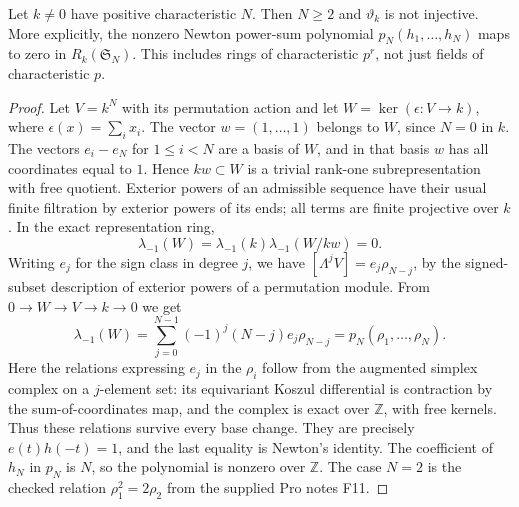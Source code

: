 \begin{proposition}
\label{C:positive_characteristic}
Let $k\ne0$ have positive characteristic $N$. Then $N\geq2$ and
$\vartheta_k$ is not injective. More explicitly, the nonzero Newton power-sum
polynomial $p_N(h_1,\ldots,h_N)$ maps to zero in $R_k(\mathfrak S_N)$.
This includes rings of characteristic $p^r$, not just fields of characteristic
$p$.
\end{proposition}
\begin{proof}
Let $V=k^N$ with its permutation action and let
$W=\ker(\epsilon:V\to k)$, where $\epsilon(x)=\sum_i x_i$. The vector
$w=(1,\ldots,1)$ belongs to $W$, since $N=0$ in $k$.
The vectors $e_i-e_N$ for $1\leq i<N$ are a basis of $W$, and in that basis
$w$ has all coordinates equal to $1$. Hence $kw\subset W$ is a trivial
rank-one subrepresentation with free quotient. Exterior powers of an admissible
sequence have their usual finite filtration by exterior powers of its ends;
all terms are finite projective over $k$. In the exact representation ring,
\[
 \lambda_{-1}(W)=\lambda_{-1}(k)\lambda_{-1}(W/kw)=0.
\]
Writing $e_j$ for the sign class in degree $j$, we have
$[\Lambda^jV]=e_j\rho_{N-j}$, by the signed-subset description of exterior
powers of a permutation module. From $0\to W\to V\to k\to0$ we get
\[
 \lambda_{-1}(W)
 =\sum_{j=0}^{N-1}(-1)^j(N-j)e_j\rho_{N-j}
 =p_N(\rho_1,\ldots,\rho_N).
\]
Here the relations expressing $e_j$ in the $\rho_i$ follow from the augmented
simplex complex on a $j$-element set: its equivariant Koszul differential is
contraction by the sum-of-coordinates map, and the complex is exact over
$\mathbb Z$, with free kernels. Thus these relations survive every base
change. They are precisely $e(t)h(-t)=1$, and the last equality is Newton's
identity. The coefficient of $h_N$ in $p_N$ is $N$, so the polynomial is
nonzero over $\mathbb Z$. The case $N=2$ is the checked relation
$\rho_1^2=2\rho_2$ from the supplied Pro notes F11.
\end{proof}


